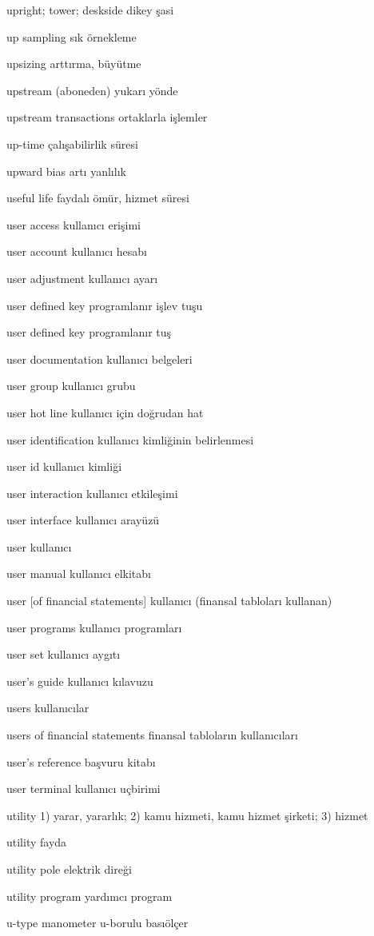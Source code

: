 \documentclass[12pt,fleqn]{article}\usepackage{../../common}
\begin{document}
upright; tower; deskside dikey şasi

up sampling sık örnekleme

upsizing arttırma, büyütme

upstream (aboneden) yukarı yönde

upstream transactions ortaklarla işlemler

up-time çalışabilirlik süresi

upward bias artı yanlılık

useful life faydalı ömür, hizmet süresi

user access kullanıcı erişimi

user account kullanıcı hesabı

user adjustment kullanıcı ayarı

user defined key programlanır işlev tuşu

user defined key programlanır tuş

user documentation kullanıcı belgeleri

user group kullanıcı grubu

user hot line kullanıcı için doğrudan hat

user identification kullanıcı kimliğinin belirlenmesi

user id kullanıcı kimliği

user interaction kullanıcı etkileşimi

user interface kullanıcı arayüzü

user kullanıcı

user manual kullanıcı elkitabı

user [of financial statements] kullanıcı (finansal tabloları kullanan)

user programs kullanıcı programları

user set kullanıcı aygıtı

user's guide kullanıcı kılavuzu

users kullanıcılar

users of financial statements finansal tabloların kullanıcıları

user's reference başvuru kitabı

user terminal kullanıcı uçbirimi

utility 1) yarar, yararlık; 2) kamu hizmeti, kamu hizmet şirketi; 3) hizmet

utility fayda

utility pole elektrik direği

utility program yardımcı program

u-type manometer u-borulu basıölçer
\end{document}
